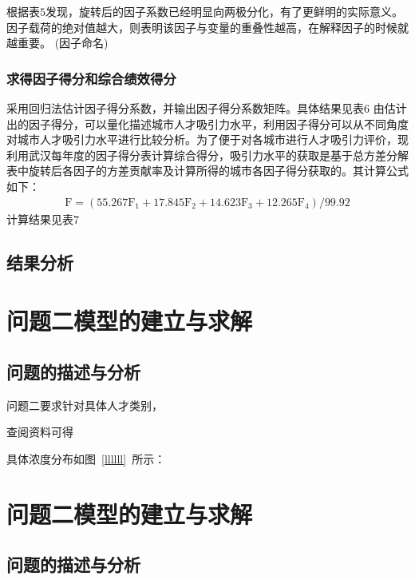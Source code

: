 \documentclass{whutmod}
\begin{document}
	根据表$5$发现，旋转后的因子系数已经明显向两极分化，有了更鲜明的实际意义。因子载荷的绝对值越大，则表明该因子与变量的重叠性越高，在解释因子的时候就越重要。
	(因子命名)
	\subsubsection{求得因子得分和综合绩效得分}
	采用回归法估计因子得分系数，并输出因子得分系数矩阵。具体结果见表$6$
	由估计出的因子得分，可以量化描述城市人才吸引力水平，利用因子得分可以从不同角度对城市人才吸引力水平进行比较分析。为了便于对各城市进行人才吸引力评价，现利用武汉每年度的因子得分表计算综合得分，吸引力水平的获取是基于总方差分解表中旋转后各因子的方差贡献率及计算所得的城市各因子得分获取的。其计算公式如下：
	\begin{gather}
	\mathrm { F } = \left( 55.267 \mathrm { F } _ { 1 } + 17.845 \mathrm { F } _ { 2 } + 14.623 \mathrm { F } _ { 3 } + 12.265 \mathrm { F } _ { 4 } \right) / 99.92
	\end{gather}
	计算结果见表$7$
	\subsection{结果分析}
	
	\section{问题二模型的建立与求解}
	\subsection{问题的描述与分析}
	问题二要求针对具体人才类别，


	查阅资料可得\parencite{宋鸿2010城市人才吸引力的影响因素及提升对策}
	
具体浓度分布如图~\ref{llllll}~所示：


	\section{问题二模型的建立与求解}
	\subsection{问题的描述与分析}
\end{document}
